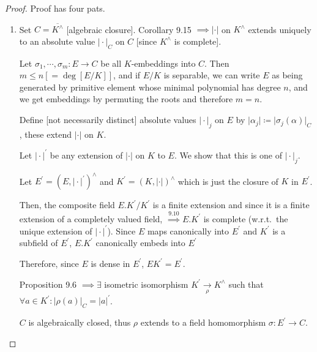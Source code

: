 \documentclass[openany]{amsbook}
\numberwithin{section}{chapter}
\theoremstyle{definition}
\begin{document}
\begin{proof}
    
    Proof has four pats.

    \begin{enumerate}[label=\alph*)]
        \item Set \(C = \overline{K^\wedge}\) [algebraic closure]. Corollary 9.15 \(\implies \vert \cdot \vert\) on \(K^\wedge\) extends uniquely to an absolute value \(\vert \cdot \vert _C\) on \(C\) [since \(K^\wedge\) is complete].
        
        Let \(\sigma_1, \cdots , \sigma_m: E \to C\) be all \(K\)-embeddings into \(C\). Then \(m \leq n [= \deg[E / K]]\), and if \(E / K\) is separable, we can write \(E\) as being generated by primitive element whose minimal polynomial has degree \(n\), and we get embeddings by permuting the roots and therefore \(m = n\).

        Define [not necessarily distinct] absolute values \(\vert \cdot \vert _j\) on \(E\) by \(\vert \alpha_j \vert \coloneqq \vert \sigma_j(\alpha) \vert _C\), these extend \(\vert \cdot \vert \) on \(K\).

        Let \(\vert \cdot \vert^{\prime} \) be any extension of \(\vert \cdot \vert \) on \(K\) to \(E\). We show that this is one of \(\vert \cdot \vert_j\).

        Let \(E^{\prime} = (E, \vert \cdot \vert ^{\prime})^\wedge\) and \(K^{\prime} = (K, \vert \cdot \vert)^\wedge\) which is just the closure of \(K\) in \(E^{\prime}\).
        
        Then, the composite field \(E.K^{\prime} / K^{\prime}\) is a finite extension and since it is a finite extension of a completely valued field, \(\overset{9.10}{\implies} E.K^{\prime}\) is complete (w.r.t.\ the unique extension of \(\vert \cdot \vert^{\prime}\)). Since \(E\) maps canonically into \(E^{\prime}\) and \(K^{\prime}\) is a subfield of \(E^{\prime}\), \(E . K^{\prime}\) canonically embeds into \(E^{\prime}\) 
        
        Therefore, since \(E\) is dense in \(E^{\prime}\), \(E K^{\prime} = E^{\prime}\).

        Proposition 9.6 \(\implies \exists\) isometric isomorphism \(K^{\prime} \underset{\rho}{\to} K^\wedge\) such that \(\forall a\in K^{\prime}: \vert \rho(a) \vert _C = \vert a \vert^{\prime}\).

        \(C\) is algebraically closed, thus \(\rho\) extends to a field homomorphism \(\sigma : E^{\prime} \to C\).


\end{enumerate}
\end{proof}
\end{document}
